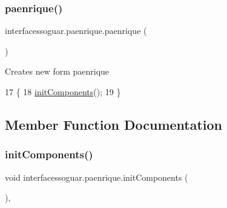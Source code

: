 \subsubsection{\texorpdfstring{paenrique()}{paenrique()}}
{\footnotesize\ttfamily interfacessoguar.\+paenrique.\+paenrique (\begin{DoxyParamCaption}{ }\end{DoxyParamCaption})\hspace{0.3cm}{\ttfamily [inline]}}

Creates new form paenrique 
\begin{DoxyCode}
17                        \{
18         \mbox{\hyperlink{classinterfacessoguar_1_1paenrique_a2dd66331089bab9a01914d7f30207fea}{initComponents}}();
19     \}
\end{DoxyCode}


\subsection{Member Function Documentation}
\mbox{\label{classinterfacessoguar_1_1paenrique_a2dd66331089bab9a01914d7f30207fea}} 
\subsubsection{\texorpdfstring{init\+Components()}{initComponents()}}
{\footnotesize\ttfamily void interfacessoguar.\+paenrique.\+init\+Components (\begin{DoxyParamCaption}{ }\end{DoxyParamCaption})\hspace{0.3cm}{\ttfamily [inline]}, {\ttfamily [private]}}

